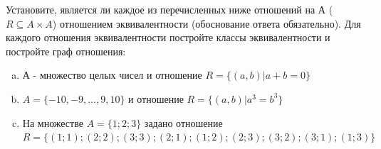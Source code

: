 \question
Установите, является ли каждое из перечисленных ниже отношений на А ($R \subseteq A \times A$) отношением эквивалентности (обоснование ответа обязательно). Для каждого отношения эквивалентности 
постройте классы эквивалентности и постройте граф отношения:
\begin{enumerate}[a)]\setcounter{enumi}{0}
\item А - множество целых чисел и отношение $R = \{(a,b)|a + b = 0\}$
\item $A = \{-10, -9, …, 9, 10\}$ и отношение $R = \{(a,b)|a^{3} = b^{3}\}$
\item На множестве $A = \{1; 2; 3\}$ задано отношение $R = \{(1; 1); (2; 2); (3; 3); (2; 1); (1; 2); (2; 3); (3; 2); (3; 1); (1; 3)\}$

\end{enumerate}